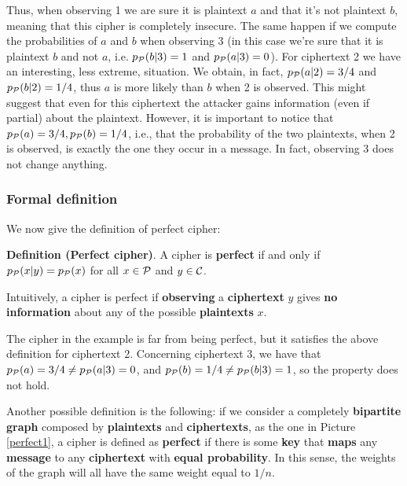 Thus, when observing 1 we are sure it is plaintext $a$ and that it's not plaintext $b$, meaning that this cipher is completely insecure. The same happen if we compute the probabilities of $a$ and $b$ when observing 3 (in this case we're sure that it is plaintext $b$ and not $a$, i.e. $p_{\cal P}(b|3) = 1$ and $p_{\cal P}(a|3) = 0$). For ciphertext 2 we have an interesting, less extreme, situation. We obtain, in fact, $p_{\cal P}(a|2) = 3/4$ and $p_{\cal P}(b|2) = 1/4$, thus $a$ is more likely than $b$ when 2 is observed. This might suggest that even for this ciphertext the attacker gains information (even if partial) about the plaintext. However, it is important to notice that $p_{\cal P}(a) = 3/4, p_{\cal P}(b) = 1/4$, i.e., that the probability of the two plaintexts, when 2 is observed, is exactly the one they occur in a message. In fact, observing 3 does not change anything.

\subsubsection{Formal definition}

We now give the definition of perfect cipher:

\textbf{Definition (Perfect cipher)}. A cipher is \textbf{perfect} if and only if $p_{\cal P}(x|y)=p_{\cal P}(x)$ for all $x \in {\cal P}$ and $y \in {\cal C}$.

Intuitively, a cipher is perfect if \textbf{observing} a \textbf{ciphertext} $y$ gives \textbf{no information} about any of the possible \textbf{plaintexts} $x$. 

The cipher in the example is far from being perfect, but it satisfies the above definition for ciphertext 2. Concerning ciphertext 3, we have that $p_{\cal P}(a) = 3/4 \neq p_{\cal P}(a|3) = 0$, and $p_{\cal P}(b) = 1/4 \neq p_{\cal P}(b|3) = 1$, so the property does not hold.

Another possible definition is the following: if we consider a completely \textbf{bipartite graph} composed by \textbf{plaintexts} and \textbf{ciphertexts}, as the one in Picture \ref{perfect1}, a cipher is defined as \textbf{perfect} if there is some \textbf{key} that \textbf{maps} any \textbf{message} to any \textbf{ciphertext} with \textbf{equal probability}. In this sense, the weights of the graph will all have the same weight equal to $1/n$. 

